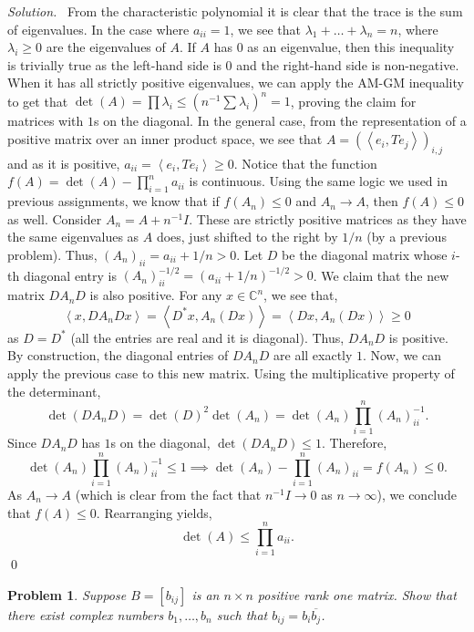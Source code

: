 \documentclass[12pt,a4paper]{article}
\newenvironment{solution}{%
  \par\noindent\textit{Solution.}\ }{\qed}
\theoremstyle{problemstyle}
\newtheorem{problem}{Problem}[section]
\def\bC{\mathbb{C}}
\newcommand{\ipp}[1]{\left\langle#1\right\rangle}
\begin{document}
\begin{solution}
    From the characteristic polynomial it is clear that the trace is the sum of eigenvalues. In the case where $a_{ii}=1$, we see that $\lambda_1+\ldots+\lambda_n=n$, where $\lambda_i\geq 0$ are the eigenvalues of $A$. 
    If $A$ has $0$ as an eigenvalue, then this inequality is trivially true as the left-hand side is $0$ and the right-hand side is non-negative. 
    When it has all strictly positive eigenvalues, we can apply the AM-GM inequality to get that $\det(A)=\prod \lambda_i \leq (n^{-1}\sum\lambda_i)^n=1$, proving the claim for matrices with $1$s on the diagonal. 
    In the general case, from the representation of a positive matrix over an inner product space, we see that $A=(\ipp{e_i,Te_j})_{i,j}$ and as it is positive, $a_{ii}=\ipp{e_i,Te_i}\geq 0$. 
    Notice that the function $f(A)=\det(A)-\prod_{i=1}^na_{ii}$ is continuous. Using the same logic we used in previous assignments, we know that if $f(A_n)\leq 0$ and $A_n\to A$, then $f(A)\leq 0$ as well. 
    Consider $A_n = A + n^{-1}I$. These are strictly positive matrices as they have the same eigenvalues as $A$ does, just shifted to the right by $1/n$ (by a previous problem). Thus, $(A_n)_{ii} = a_{ii} + 1/n > 0$.
    Let $D$ be the diagonal matrix whose $i$-th diagonal entry is $(A_n)_{ii}^{-1/2} = (a_{ii}+1/n)^{-1/2} > 0$. We claim that the new matrix $DA_nD$ is also positive. For any $x\in\bC^n$, we see that,
    \[
        \ipp{x, DA_nDx} = \ipp{D^*x, A_n(Dx)} = \ipp{Dx, A_n(Dx)} \geq 0
    \]
    as $D=D^*$ (all the entries are real and it is diagonal). Thus, $DA_nD$ is positive. By construction, the diagonal entries of $DA_nD$ are all exactly $1$. 
    Now, we can apply the previous case to this new matrix. Using the multiplicative property of the determinant,
    \[
        \det(DA_nD) = \det(D)^2\det(A_n) = \det(A_n)\prod_{i=1}^n(A_n)_{ii}^{-1}.
    \]
    Since $DA_nD$ has $1$s on the diagonal, $\det(DA_nD) \leq 1$. Therefore,
    \[
        \det(A_n)\prod_{i=1}^n(A_n)_{ii}^{-1} \leq 1 \implies \det(A_n)-\prod_{i=1}^n(A_n)_{ii} = f(A_n) \leq 0.
    \]
    As $A_n\to A$ (which is clear from the fact that $n^{-1}I\to 0$ as $n\to\infty$), we conclude that $f(A)\leq 0$. Rearranging yields,
    \[
        \det(A)\leq\prod_{i=1}^na_{ii}.
    \]
\end{solution}	
\begin{problem}\label{prob:4-3}
Suppose $B = [b_{ij}]$ is an $n \times n$ positive rank one matrix. Show that there exist complex numbers $b_1, \ldots, b_n$ such that $b_{ij} = b_i \overline{b_j}$.
\end{problem}
\end{document}
